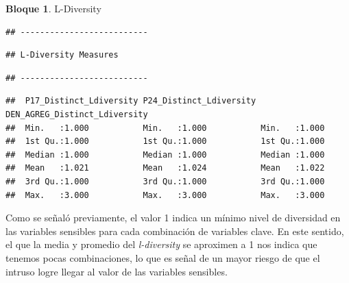 \documentclass[]{book}
\newenvironment{Shaded}{\begin{snugshade}}{\end{snugshade}}
\newcommand{\CommentTok}[1]{\textcolor[rgb]{0.56,0.35,0.01}{\textit{#1}}}
\newcommand{\DataTypeTok}[1]{\textcolor[rgb]{0.13,0.29,0.53}{#1}}
\newcommand{\DecValTok}[1]{\textcolor[rgb]{0.00,0.00,0.81}{#1}}
\newcommand{\KeywordTok}[1]{\textcolor[rgb]{0.13,0.29,0.53}{\textbf{#1}}}
\newcommand{\NormalTok}[1]{#1}
\newcommand{\OperatorTok}[1]{\textcolor[rgb]{0.81,0.36,0.00}{\textbf{#1}}}
\newcommand{\OtherTok}[1]{\textcolor[rgb]{0.56,0.35,0.01}{#1}}
\newcommand{\StringTok}[1]{\textcolor[rgb]{0.31,0.60,0.02}{#1}}
\theoremstyle{definition}
\theoremstyle{definition}
\newtheorem{example}{Bloque}[chapter]
\theoremstyle{definition}
\theoremstyle{definition}
\theoremstyle{remark}
\begin{document}
\begin{example}
\protect\hypertarget{exm:bloque52nbm}{}{\label{exm:bloque52nbm} }L-Diversity
\end{example}

\begin{Shaded}
\end{Shaded}

\begin{verbatim}
## --------------------------
\end{verbatim}

\begin{verbatim}
## L-Diversity Measures
\end{verbatim}

\begin{verbatim}
## --------------------------
\end{verbatim}

\begin{verbatim}
##  P17_Distinct_Ldiversity P24_Distinct_Ldiversity DEN_AGREG_Distinct_Ldiversity
##  Min.   :1.000           Min.   :1.000           Min.   :1.000                
##  1st Qu.:1.000           1st Qu.:1.000           1st Qu.:1.000                
##  Median :1.000           Median :1.000           Median :1.000                
##  Mean   :1.021           Mean   :1.024           Mean   :1.022                
##  3rd Qu.:1.000           3rd Qu.:1.000           3rd Qu.:1.000                
##  Max.   :3.000           Max.   :3.000           Max.   :3.000
\end{verbatim}

Como se señaló previamente, el valor 1 indica un mínimo nivel de diversidad en las variables sensibles para cada
combinación de variables clave. En este sentido, el que la media y promedio del \emph{l-diversity} se aproximen a 1 nos indica que tenemos pocas combinaciones, lo que es señal de un mayor riesgo de que el intruso logre llegar al valor de las variables sensibles.
\end{document}

